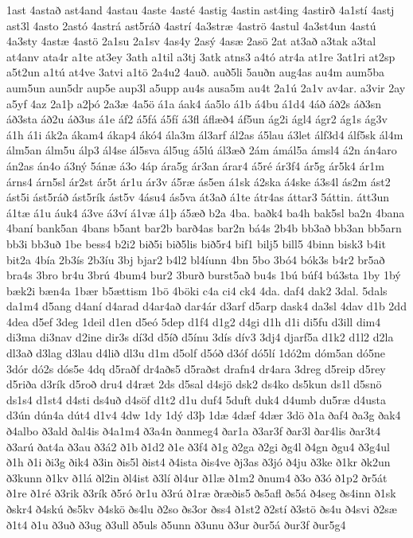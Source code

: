 {1ast
4astað
ast4and
4astau
4aste
4asté
4astig
4astin
ast4ing
4astirð
4a1stí
4astj
ast3l
4asto
2astó
4astrá
ast5ráð
4astrí
4a3stræ
4aströ
4astul
4a3st4un
4astú
4a3sty
4astæ
4astö
2a1su
2a1sv
4as4y
2asý
4asæ
2asö
2at
at3að
a3tak
a3tal
at4anv
ata4r
a1te
at3ey
3ath
a1til
a3tj
3atk
atns3
a4tó
atr4a
at1re
3at1ri
at2sp
a5t2un
a1tú
at4ve
3atvi
a1tö
2a4u2
4auð.
auð5li
5auðn
aug4as
au4m
aum5ba
aum5un
aun5dr
aup5e
aup3l
a5upp
au4s
ausa5m
au4t
2a1ú
2a1v
av4ar.
a3vir
2ay
a5yf
4az
2a1þ
a2þó
2a3æ
4a5ö
á1a
áak4
áa5lo
á1b
á4bu
á1d4
4áð
áð2s
áð3sn
áð3sta
áð2u
áð3us
á1e
áf2
á5fá
á5fí
á3fl
áflæð4
áf5un
ág2i
ágl4
ágr2
ág1s
ág3v
á1h
á1i
ák2a
ákam4
ákap4
ákó4
ála3m
ál3arf
ál2as
á5lau
á3let
álf3d4
álf5sk
ál4m
álm5an
álm5u
álp3
ál4se
ál5sva
ál5ug
á5lú
ál3æð
2ám
ámál5a
ámsl4
á2n
án4aro
án2as
án4o
á3ný
5ánæ
á3o
4áp
ára5g
ár3an
árar4
á5ré
ár3f4
ár5g
ár5k4
ár1m
árns4
árn5sl
ár2st
ár5t
ár1u
ár3v
á5ræ
ás5en
á1sk
á2ska
á4ske
á3s4l
ás2m
ást2
ást5i
ást5ráð
ást5rík
ást5v
4ásu4
ás5va
át3að
á1te
átr4as
áttar3
5áttin.
átt3un
á1tæ
á1u
áuk4
á3ve
á3ví
á1væ
á1þ
á5æð
b2a
4ba.
baðk4
ba4h
bak5sl
ba2n
4bana
4baní
bank5an
4bans
b5ant
bar2b
barð4as
bar2n
bá4s
2b4b
bb3að
bb3an
bb5arn
bb3i
bb3uð
1be
bess4
b2i2
bið5i
bið5lis
bið5r4
bif1
bilj5
bill5
4binn
bisk3
b4it
bit2a
4bía
2b3ís
2b3íu
3bj
bjar2
b4l2
bl4íunn
4bn
5bo
3bó4
bók3s
b4r2
br5að
bra4s
3bro
br4u
3brú
4bum4
bur2
3burð
burst5að
bu4s
1bú
búf4
bú3sta
1by
1bý
bæk2i
bæn4a
1bær
b5ættism
1bö
4böki
c4a
ci4
ck4
4da.
daf4
dak2
3dal.
5dals
da1m4
d5ang
d4aní
d4arad
d4ar4að
dar4ár
d3arf
d5arp
dask4
da3sl
4dav
d1b
2dd
4dea
d5ef
3deg
1deil
d1en
d5eó
5dep
d1f4
d1g2
d4gi
d1h
d1i
di5fu
d3ill
dim4
di3ma
di3nav
d2ine
dir3s
dí3d
d5íð
d5ínu
3dís
dív3
3dj4
djarf5a
d1k2
d1l2
d2la
dl3að
d3lag
d3lau
d4lið
dl3u
d1m
d5olf
d5óð
d3óf
dó5lí
1dó2m
dóm5an
dó5ne
3dór
dó2s
dós5e
4dq
d5raðf
dr4aðs5
d5raðst
drafn4
dr4ara
3dreg
d5reip
d5rey
d5riða
d3rík
d5roð
dru4
d4ræt
2ds
d5sal
d4sjö
dsk2
ds4ko
ds5kun
ds1l
d5snö
ds1s4
d1st4
d4sti
ds4uð
d4söf
d1t2
d1u
duf4
5duft
duk4
d4umb
du5ræ
d4usta
d3ún
dún4a
dút4
d1v4
4dw
1dy
1dý
d3þ
1dæ
4dæf
4dær
3dö
ð1a
ðaf4
ða3g
ðak4
ð4albo
ð3ald
ðal4is
ð4a1m4
ð3a4n
ðanmeg4
ðar1a
ð3ar3f
ðar3l
ðar4lis
ðar3t4
ð3arú
ðat4a
ð3au
ð3á2
ð1b
ð1d2
ð1e
ð3f4
ð1g
ð2ga
ð2gi
ðg4l
ð4gn
ðgu4
ð3g4ul
ð1h
ð1i
ði3g
ðik4
ð3in
ðis5l
ðist4
ð4ista
ðis4ve
ðj3as
ð3jó
ð4ju
ð3ke
ð1kr
ðk2un
ð3kunn
ð1kv
ð1lá
ðl2in
ðl4ist
ð3lí
ðl4ur
ð1læ
ð1m2
ðnum4
ð3o
ð3ó
ð1p2
ðr5át
ð1re
ð1ré
ð3rik
ð3rík
ð5ró
ðr1u
ð3rú
ð1ræ
ðræðis5
ðs5afl
ðs5á
ð4seg
ðs4inn
ð1sk
ðskr4
ð4skú
ðs5kv
ð4skö
ðs4lu
ð2so
ðs3or
ðss4
ð1st2
ð2stí
ð3stö
ðs4u
ð4svi
ð2sæ
ð1t4
ð1u
ð3uð
ð3ug
ð3ull
ð5uls
ð5unn
ð3unu
ð3ur
ður5á
ður3f
ður5g4
}
